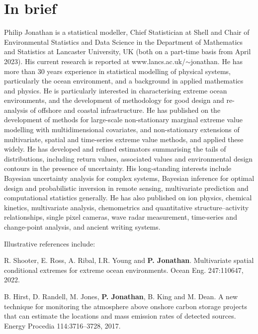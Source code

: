 \documentclass[11pt,a4paper]{moderncv}
\begin{document}
\makecvtitle

\vspace{-30pt}

\section{In brief}

\setlength{\parskip}{0.5em}

Philip Jonathan is a statistical modeller, Chief Statistician at Shell and Chair of Environmental Statistics and Data Science in the Department of Mathematics and Statistics at Lancaster University, UK (both on a part-time basis from April 2023). His current research is reported at www.lancs.ac.uk/$\sim$jonathan. He has more than 30 years experience in statistical modelling of physical systems, particularly the ocean environment, and a background in applied mathematics and physics. He is particularly interested in characterising extreme ocean environments, and the development of methodology for good design and re-analysis of offshore and coastal infrastructure. He has published on the development of methods for large-scale non-stationary marginal extreme value modelling with multidimensional covariates, and non-stationary extensions of multivariate, spatial and time-series extreme value methods, and applied these widely. He has developed and refined estimators summarising the tails of distributions, including return values, associated values and environmental design contours in the presence of uncertainty. His long-standing interests include Bayesian uncertainty analysis for complex systems, Bayesian inference for optimal design and probabilistic inversion in remote sensing, multivariate prediction and computational statistics generally. He has also published on ion physics, chemical kinetics, multivariate analysis, chemometrics and quantitative structure--activity relationships, single pixel cameras, wave radar measurement, time-series and change-point analysis, and ancient writing systems.

Illustrative references include:

\setlength{\parskip}{0.5em}

R. Shooter, E. Ross, A. Ribal, I.R. Young and \textbf{P. Jonathan}. Multivariate spatial conditional extremes for extreme ocean environments. Ocean Eng. 247:110647, 2022.

B. Hirst, D. Randell, M. Jones, \textbf{P. Jonathan}, B. King and M. Dean. A new technique for monitoring the atmosphere above onshore carbon storage projects that can estimate the locations and mass emission rates of detected sources.  Energy Procedia 114:3716--3728, 2017.
\end{document}
